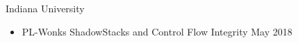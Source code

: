 \documentclass[11pt]{article}
\renewcommand{\section}[1]{\pagebreak[3]%
    \hyphenpenalty=10000%
    \vspace{1.3\baselineskip}%
    \phantomsection\addcontentsline{toc}{section}{#1}%
    \noindent\llap{\scshape\smash{\parbox[t]{\marginparwidth}{\raggedright #1}}}%
    \vspace{-\baselineskip}\par}
\newenvironment{innerlist}[1][\enskip\textbullet]%
        {\begin{itemize}[#1,leftmargin=*,parsep=0pt,itemsep=0pt,topsep=0pt,partopsep=0pt]}
        {\end{itemize}}
\newcommand{\halfblankline}{\quad\vspace{-0.5\baselineskip}\pagebreak[3]}
\begin{document}
\halfblankline

Indiana University
\begin{innerlist}
\item PL-Wonks ShadowStacks and Control Flow Integrity \hfill May 2018
\end{innerlist}








\end{document}

